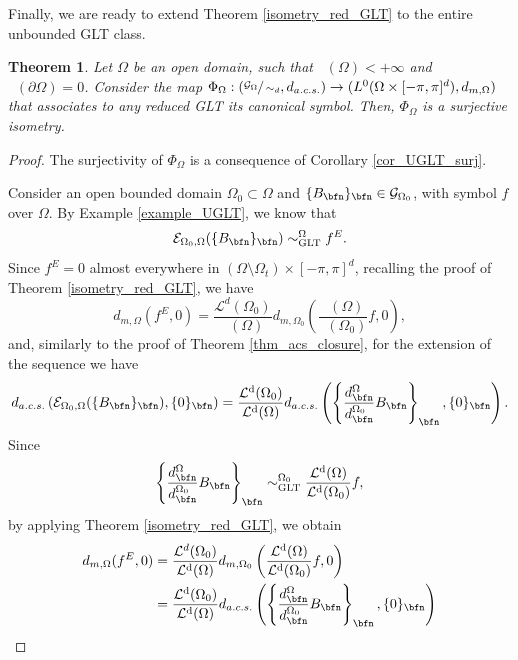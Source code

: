 \documentclass{amsart}
\newtheorem{thm}{Theorem}[section]
\DeclareMathOperator{\Ld}{\mathcal{L}^d}
\begin{document}
Finally, we are ready to extend Theorem \ref{isometry_red_GLT} to the entire unbounded GLT class.
\begin{thm}\label{thm_isom_final}
 Let $\Omega$ be an open domain, such that $\Ld(\Omega)<+\infty$ and $\Ld(\partial\Omega)=0$. Consider the map $\Phi_\Omega:(\sfrac{\mathcal{G}_\Omega}{\sim_d},d_{a.c.s.})\to(L^0(\Omega\times[-\pi,\pi]^d),d_{m,\Omega})$ that associates to any reduced GLT its canonical symbol. Then, $\Phi_\Omega$ is a surjective isometry.    
\end{thm}
\begin{proof} The surjectivity of $\Phi_\Omega$ is a consequence of Corollary \ref{cor_UGLT_surj}.

Consider an open bounded domain $\Omega_0\subset\Omega$ and $\{B_\bfn\}_\bfn\in\mathcal{G}_{\Omega_0}$, with symbol $f$ over $\Omega$. By Example \ref{example_UGLT}, we know that 
\begin{equation*}
    \mathcal{E}_{\Omega_0,\Omega}(\{B_\bfn\}_\bfn)\sim_{\mathrm{GLT}}^{\Omega}f^E.
\end{equation*}
Since $f^E=0$ almost everywhere in $(\Omega\setminus\Omega_t)\times[-\pi,\pi]^d$, recalling the proof of Theorem \ref{isometry_red_GLT}, we have
\begin{equation}\label{iso_uglt_eq_1}
    d_{m,\Omega}(f^E,0)=\frac{\mathcal{L}^d(\Omega_0)}{\Ld(\Omega)}d_{m,\Omega_0}\left(\frac{\Ld(\Omega)}{\Ld(\Omega_0)}f,0\right),
\end{equation}
and, similarly to the proof of Theorem \ref{thm_acs_closure}, for the extension of the sequence we have
\begin{equation}\label{iso_uglt_eq_2}
d_{a.c.s.}\left(\mathcal{E}_{\Omega_0,\Omega}(\{B_\bfn\}_\bfn),\{0\}_\bfn\right)=\frac{\Ld(\Omega_0)}{\Ld(\Omega)}d_{a.c.s.}\left(\left\{\frac{d_\bfn^{\Omega}}{d_\bfn^{\Omega_0}}B_\bfn\right\}_\bfn,\{0\}_\bfn\right).
\end{equation}
Since 
\begin{equation*}
    \left\{\frac{d_\bfn^{\Omega}}{d_\bfn^{\Omega_0}}B_\bfn\right\}_\bfn\sim_{\mathrm{GLT}}^{\Omega_0}\frac{\Ld(\Omega)}{\Ld(\Omega_0)}f,
\end{equation*}
by applying Theorem \ref{isometry_red_GLT}, we obtain
\begin{align*}
    d_{m,\Omega}(f^E,0)&=\frac{\mathcal{L}^d(\Omega_0)}{\Ld(\Omega)}d_{m,\Omega_0}\left(\frac{\Ld(\Omega)}{\Ld(\Omega_0)}f,0\right)\\
    &=\frac{\Ld(\Omega_0)}{\Ld(\Omega)}d_{a.c.s.}\left(\left\{\frac{d_\bfn^{\Omega}}{d_\bfn^{\Omega_0}}B_\bfn\right\}_\bfn,\{0\}_\bfn\right)\\

\end{align*}
\end{proof}
\end{document}
